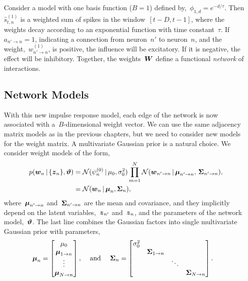 Consider a model with one basis function ($B=1$) defined
by,~${\phi_{1,d} = e^{-d/\tau}}$.
Then~$\widehat{s}_{t,n}^{(1)}$ is a weighted sum of spikes in the
window~$[t-D,t-1]$, where the weights decay
according to an exponential function with time constant~$\tau$.  
If~${a_{n' \to n}=1}$, indicating a
connection from neuron~$n'$ to neuron~$n$, and
the weight,~$w_{n' \to n}^{(1)}$, is positive, the influence will be
excitatory. If it is negative, the effect will be inhibitory.
Together, the weights~$\boldsymbol{W}$ define a functional \emph{network} of
interactions.

\subsection{Network Models}
With this new impulse response model, each edge of the network 
is now associated with a~$B$-dimensional weight vector. We can 
use the same adjacency matrix models as in the previous chapters,
but we need to consider new models for the weight matrix. A 
multivariate Gaussian prior is a natural choice. We consider 
weight models of the form,
\begin{align*}
  p(\boldsymbol{w}_n \,|\, \{\boldsymbol{z}_n\}, \boldsymbol{\vartheta}) 
  &= \mathcal{N}(\psi_n^{(0)} \,|\, \mu_0, \sigma^2_0 ) \prod_{m=1}^N 
     \mathcal{N}(\boldsymbol{w}_{n' \to n} \,|\, \boldsymbol{\mu}_{n' \to n}, \, \boldsymbol{\Sigma}_{n' \to n}), \\
  &= \mathcal{N}(\boldsymbol{w}_n \,|\, \boldsymbol{\mu}_n, \boldsymbol{\Sigma}_n),
\end{align*}
where~$\boldsymbol{\mu}_{n' \to n}$ and~$\boldsymbol{\Sigma}_{n' \to n}$ are the mean and covariance,
and they implicitly depend on the latent variables,~$\boldsymbol{z}_{n'}$ and~$\boldsymbol{z}_n$, and
the parameters of the network model,~$\boldsymbol{\vartheta}$.
The last line combines the Gaussian factors into single multivariate Gaussian prior
with parameters,
\begin{align}
  \boldsymbol{\mu}_n 
    &= \begin{bmatrix}
      \mu_0 \\
      \boldsymbol{\mu}_{1 \to n} \\
      \vdots \\
      \boldsymbol{\mu}_{N \to n}
    \end{bmatrix}, & \text{ and } & &
  \boldsymbol{\Sigma}_n 
  &= \begin{bmatrix}
    \sigma_0^2 &                     &        & \\
               & \boldsymbol{\Sigma}_{1 \to n}   &        & \\
               &                     & \ddots & \\
               &                     &        & \boldsymbol{\Sigma}_{N \to n} 
    \end{bmatrix}.
\end{align}


